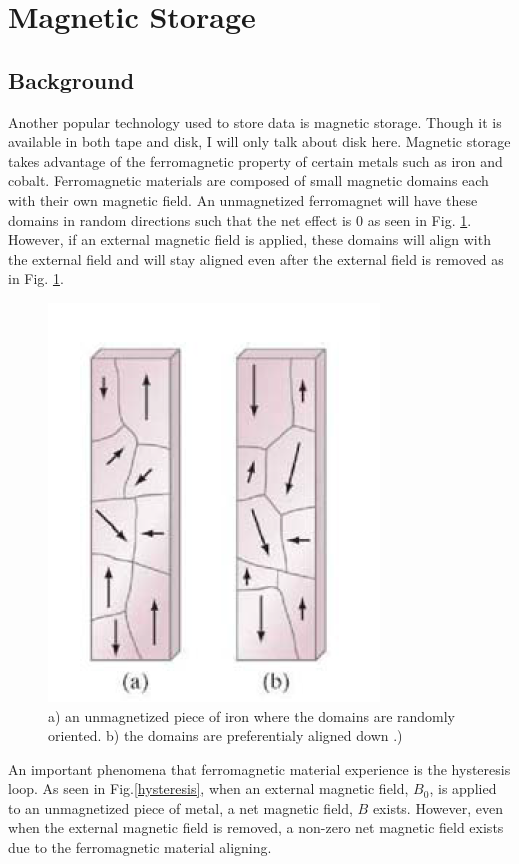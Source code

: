 \documentclass[ notitlepage, numerical, 11pt]{revtex4-1} %
\begin{document}
\section{Magnetic Storage}
\subsection{Background}
Another popular technology used to store data is magnetic storage. Though it is available in both tape and disk, I will only talk about disk here. Magnetic storage takes advantage of the ferromagnetic property of certain metals such as iron and cobalt. Ferromagnetic materials are composed of small magnetic domains each with their own magnetic field. An unmagnetized ferromagnet will have these domains in random directions such that the net effect is 0 as seen in Fig. \ref{domain}. However, if an external magnetic field is applied, these domains will align with the external field and will stay aligned even after the external field is removed as in Fig. \ref{domain}.

\begin{figure}[H]
\centerline{\includegraphics[scale=.45]{magneticDomain.png}}
\caption{a) an unmagnetized piece of iron where the domains are randomly oriented. b) the domains are preferentialy aligned down \cite{modernPhysics}.)}
\label{domain}
\end{figure} 
An important phenomena that ferromagnetic material experience is the hysteresis loop. As seen in Fig.\ref{hysteresis}, when an external magnetic field, $B_0$, is applied to an unmagnetized piece of metal, a net magnetic field, $B$ exists. However, even when the external magnetic field is removed, a non-zero net magnetic field exists due to the ferromagnetic material aligning.
\end{document}
